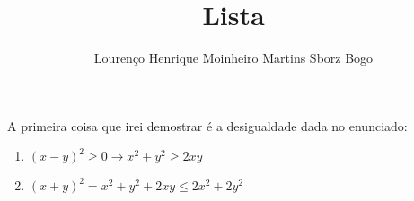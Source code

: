 \documentclass[12pt]{article}
\title{Lista}
\author{Lourenço Henrique Moinheiro Martins Sborz Bogo}
\date{}
\begin{document}
\maketitle

A primeira coisa que irei demostrar é a desigualdade dada no enunciado:

\begin{enumerate}
  \item ${(x-y)}^{2} \geq 0 \rightarrow x^{2}+y^{2} \geq 2xy$
  \item ${(x+y)^{2} = x^{2}+y^{2}+2xy \leq 2x^{2}+2y^{2}}$
\end{enumerate}
\end{document}
